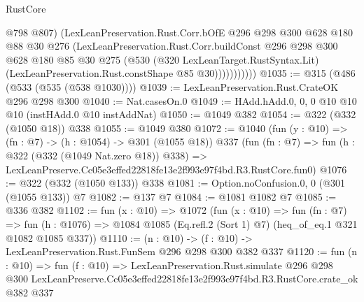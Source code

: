 \begin{lexlean}{RustCore}
\begin{coremodule}
                    @798
                    @807)
                  (LexLeanPreservation.Rust.Corr.bOfE
                    @296
                    @298
                    @300
                    @628
                    @180
                    @88
                    @30
                    @276
                    (LexLeanPreservation.Rust.Corr.buildConst
                      @296
                      @298
                      @300
                      @628
                      @180
                      @85
                      @30
                      @275
                      (@530
                        (@320 LexLeanTarget.RustSyntax.Lit)
                        (LexLeanPreservation.Rust.constShape @85 @30)))))))))))
@1035 := @315 (@486 (@533 (@535 (@538 @1030))))
@1039 := LexLeanPreservation.Rust.CrateOK @296 @298 @300
@1040 := Nat.casesOn.{0}
@1049 := HAdd.hAdd.{0, 0, 0} @10 @10 @10 (instHAdd.{0} @10 instAddNat)
@1050 := @1049 @382
@1054 := @322 (@332 (@1050 @18)) @338
@1055 := @1049 @380
@1072 := @1040
    (fun (y : @10) => (fn : @7) -> (h : @1054) -> @301 (@1055 @18))
    @337
    (fun (fn : @7) =>
    fun (h : @322 (@332 (@1049 Nat.zero @18)) @338) =>
    LexLeanPreserve.Cc05e3effed22818fe13e2f993e97f4bd.R3.RustCore.fun0)
@1076 := @322 (@332 (@1050 @133)) @338
@1081 := Option.noConfusion.{0, 0} (@301 (@1055 @133)) @7
@1082 := @137 @7
@1084 := @1081 @1082 @7
@1085 := @336 @382
@1102 := fun (x : @10) =>
  @1072
    (fun (x : @10) =>
    fun (fn : @7) =>
    fun (h : @1076) => @1084 @1085 (Eq.refl.{2} (Sort 1) @7) (heq_of_eq.{1} @321 @1082 @1085 @337))
@1110 := (n : @10) -> (f : @10) -> LexLeanPreservation.Rust.FunSem @296 @298 @300 @382 @337
@1120 := fun (n : @10) =>
  fun (f : @10) =>
  LexLeanPreservation.Rust.simulate
    @296
    @298
    @300
    LexLeanPreserve.Cc05e3effed22818fe13e2f993e97f4bd.R3.RustCore.crate_ok
    @382
    @337
\end{coremodule}
\end{lexlean}
